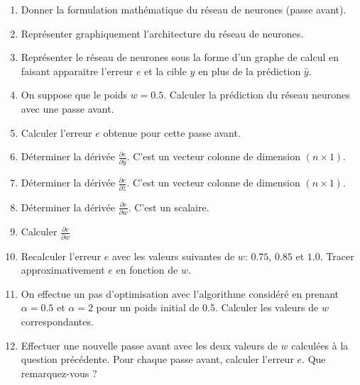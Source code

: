 \documentclass[]{../exercices}
\begin{document}
\begin{exercice}
		\begin{enumerate}
			\item Donner la formulation mathématique du réseau de neurones (passe avant).
			\item Représenter graphiquement l'architecture du réseau de neurones.
			\item Représenter le réseau de neurones sous la forme d'un graphe de calcul en faisant apparaitre l'erreur $e$ et la cible $y$ en plus de la prédiction $\hat{y}$.
			\item On suppose que le poids $w = 0.5$. Calculer la prédiction du réseau neurones avec une passe avant.
			\item Calculer l'erreur $e$ obtenue pour cette passe avant.
			\item Déterminer la dérivée $\displaystyle \frac{\partial{e}}{\partial{\hat{y}}}$. C'est un vecteur colonne de dimension $(n \times 1)$.
			\item Déterminer la dérivée $\displaystyle \frac{\partial{e}}{\partial{\hat{z}}}$. C'est un vecteur colonne de dimension $(n \times 1)$.
			\item Déterminer la dérivée $\displaystyle \frac{\partial{e}}{\partial{w}}$. C'est un scalaire.
			\item Calculer $\displaystyle \frac{\partial{e}}{\partial{w}}$
			\item Recalculer l'erreur $e$ avec les valeurs suivantes de $w$: $0.75$, $0.85$ et $1.0$. Tracer approximativement $e$ en fonction de $w$.
			\item On effectue un pas d'optimisation avec l'algorithme considéré en prenant $\alpha = 0.5$ et $\alpha = 2$ pour un poids initial de $0.5$. Calculer les valeurs de $w$ correspondantes.
			\item Effectuer une nouvelle passe avant avec les deux valeurs de $w$ calculées à la question précédente. Pour chaque passe avant, calculer l'erreur $e$. Que remarquez-vous ?
		\end{enumerate}
	\end{exercice}
\end{document}
